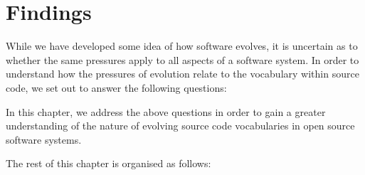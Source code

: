 \chapter{Findings} %
\label{cha:findings}


While we have developed some idea of how software evolves, it is uncertain as to whether the same pressures apply to all aspects of a software system. In order to understand how the pressures of evolution relate to the vocabulary within source code, we set out to answer the following questions:


In this chapter, we address the above questions in order to gain a greater understanding of the nature of evolving source code vocabularies in open source software systems.

The rest of this chapter is organised as follows:



